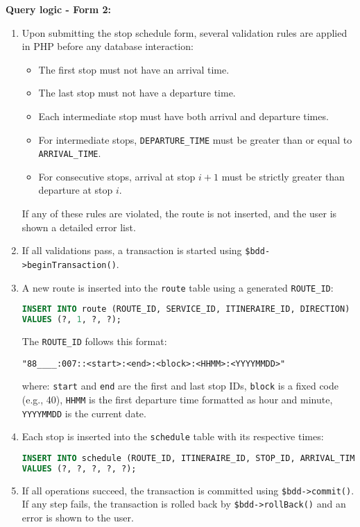 \documentclass[a4paper, 12pt]{article}
\begin{document}
\textbf{Query logic - Form 2:}
\begin{enumerate}
    \item Upon submitting the stop schedule form, several validation rules are applied in PHP before any database interaction:
    \begin{itemize}
        \item The first stop must not have an arrival time.
        \item The last stop must not have a departure time.
        \item Each intermediate stop must have both arrival and departure times.
        \item For intermediate stops, \texttt{DEPARTURE\_TIME} must be greater than or equal to \texttt{ARRIVAL\_TIME}.
        \item For consecutive stops, arrival at stop $i+1$ must be strictly greater than departure at stop $i$.
    \end{itemize}
    If any of these rules are violated, the route is not inserted, and the user is shown a detailed error list.

    \item If all validations pass, a transaction is started using \texttt{\$bdd->beginTransaction()}.

    \item A new route is inserted into the \texttt{route} table using a generated \texttt{ROUTE\_ID}:
    \begin{lstlisting}[language=SQL]
INSERT INTO route (ROUTE_ID, SERVICE_ID, ITINERAIRE_ID, DIRECTION)
VALUES (?, 1, ?, ?);
    \end{lstlisting}
    The \texttt{ROUTE\_ID} follows this format:
    \begin{lstlisting}
"88____:007::<start>:<end>:<block>:<HHMM>:<YYYYMMDD>"
    \end{lstlisting}
    where: \texttt{start} and \texttt{end} are the first and last stop IDs, \texttt{block} is a fixed code (e.g., 40), \texttt{HHMM} is the first departure time formatted as hour and minute, \texttt{YYYYMMDD} is the current date.

    \item Each stop is inserted into the \texttt{schedule} table with its respective times:
    \begin{lstlisting}[language=SQL]
INSERT INTO schedule (ROUTE_ID, ITINERAIRE_ID, STOP_ID, ARRIVAL_TIME, DEPARTURE_TIME)
VALUES (?, ?, ?, ?, ?);
    \end{lstlisting}

    \item If all operations succeed, the transaction is committed using \texttt{\$bdd->commit()}. If any step fails, the transaction is rolled back by \texttt{\$bdd->rollBack()} and an error is shown to the user.
\end{enumerate}
\end{document}
